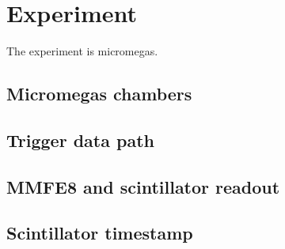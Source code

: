 \section{Experiment}
\label{sec:exp}

The experiment is micromegas.

\subsection{Micromegas chambers}
\label{sec:exp-mm}

\subsection{Trigger data path}
\label{sec:exp-art}

\subsection{MMFE8 and scintillator readout}
\label{sec:exp-mmfe}

\subsection{Scintillator timestamp}
\label{sec:exp-scitime}


